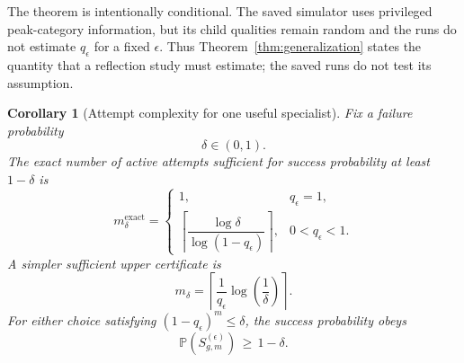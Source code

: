 \documentclass{article} %
\newtheorem{corollary}[theorem]{Corollary}
\begin{document}
The theorem is intentionally conditional. The saved simulator uses privileged
peak-category information, but its child qualities remain random and the runs
do not estimate \(q_\epsilon\) for a fixed \(\epsilon\). Thus
Theorem~\ref{thm:generalization} states the quantity that a reflection study
must estimate; the saved runs do not test its assumption.

\begin{corollary}[Attempt complexity for one useful specialist]
\label{cor:app-specialist-sample}
Fix a failure probability
\begin{equation}
\label{eq:app-third-delta}
\delta
\in
(0,1).
\end{equation}
The exact number of active attempts sufficient for success probability at least \(1-\delta\) is
\begin{equation}
\label{eq:app-third-exact-m}
m_{\delta}^{\mathrm{exact}}
=
\begin{cases}
1, & q_\epsilon=1,\\[1mm]
\left\lceil
\dfrac{\log \delta}{\log(1-q_{\epsilon})}
\right\rceil, & 0<q_\epsilon<1.
\end{cases}
\end{equation}
A simpler sufficient upper certificate is
\begin{equation}
\label{eq:app-third-simple-m}
m_{\delta}
=
\left\lceil
\frac{1}{q_{\epsilon}}
\log\!\left(\frac{1}{\delta}\right)
\right\rceil .
\end{equation}
For either choice satisfying \((1-q_{\epsilon})^{m}\le\delta\), the success probability obeys
\begin{equation}
\label{eq:app-third-sample-result}
\mathbb{P}\!\left(
S_{g,m}^{(\epsilon)}
\right)
\,\ge\,
1-\delta.
\end{equation}
\end{corollary}
\end{document}
